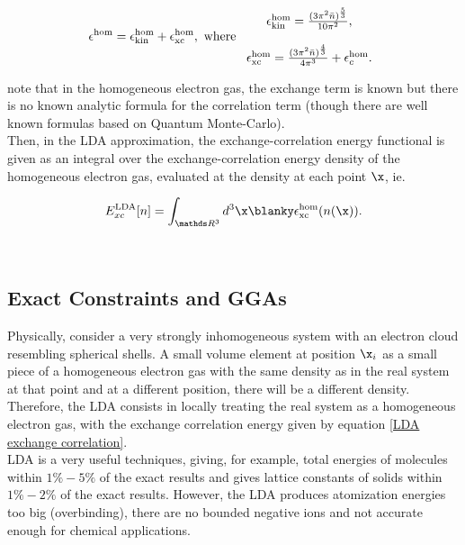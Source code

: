 \documentclass{homework}
\begin{document}
$$
\epsilon^{\textnormal{hom}} = \epsilon_{\textnormal{kin}}^{\textnormal{hom}} + \epsilon_{\textnormal{xc}}^{\textnormal{hom}}, \textnormal{ where } \begin{array}{c}
     \epsilon_{\textnormal{kin}}^{\textnormal{hom}} = \frac{(3\pi^2 \Bar{n})^{\frac{5}{3}}}{10\pi^2}, \\
     \\
     \epsilon_{\textnormal{xc}}^{\textnormal{hom}} = \frac{(3\pi^2 \Bar{n})^{\frac{4}{3}}}{4\pi^3} + \epsilon_{c}^{\textnormal{hom}}.
\end{array}
$$

note that in the homogeneous electron gas, the exchange term is known but there is no known analytic formula for the correlation term (though there are well known formulas based on Quantum Monte-Carlo). \\

Then, in the LDA approximation, the exchange-correlation energy functional is given as an integral over the exchange-correlation energy density of the homogeneous electron gas, evaluated at the density at each point $\x$, ie. 

\begin{equation}
E_{xc}^{\textnormal{LDA}} [n] = \int_{\R^3} d^3 \x \blanky \epsilon_{\textnormal{xc}}^{\textnormal{hom}}(n(\x)).
\label{LDA exchange correlation}
\end{equation}

\blanky \\

\subsection{Exact Constraints and GGAs}

Physically, consider a very strongly inhomogeneous system with an electron cloud resembling spherical shells. A small volume element at position $\x_i$ as a small piece of a homogeneous electron gas with the same density as in the real system at that point and at a different position, there will be a different density. Therefore, the LDA consists in locally treating the real system as a homogeneous electron gas, with the exchange correlation energy given by equation \eqref{LDA exchange correlation}. \\

LDA is a very useful techniques, giving, for example, total energies of molecules within $1\% - 5\%$ of the exact results and gives lattice constants of solids within $1\% - 2\%$ of the exact results. However, the LDA produces atomization energies too big (overbinding), there are no bounded negative ions and not accurate enough for chemical applications. \\
\end{document}

